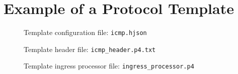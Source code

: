 \chapter{Example of a Protocol Template}
\label{cap:protocol_template}

\begin{figure}[htb]
    \centering
    \caption{Template configuration file: \texttt{icmp.hjson}}
    
    \label{code:icmp_template:config}
\end{figure}

\begin{figure}[htb]
    \centering
    \caption{Template header file: \texttt{icmp\_header.p4.txt}}
    
    \label{code:icmp_template:header}
\end{figure}

\begin{figure}[htb]
    \centering
    \caption{Template ingress processor file: \texttt{ingress\_processor.p4}}
    
    \label{code:icmp_template:ingress_processor}
\end{figure}